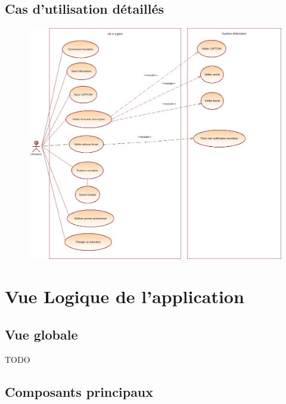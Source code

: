 \documentclass{life-fr}
\begin{document}
\section{Cas d'utilisation détaillés}

\begin{figure}[H]
  \begin{center}
    \includegraphics[width=15cm]{img/use_case_detailles.png}
  \end{center}
\end{figure}


\chapter{Vue Logique de l’application}
\section{Vue globale}

TODO

\section{Composants principaux}
\end{document}
